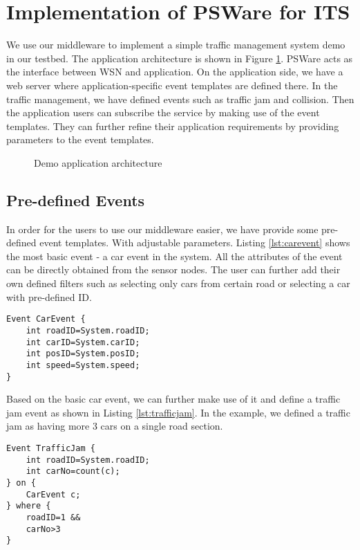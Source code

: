 \section{Implementation of PSWare for ITS}
We use our middleware to implement a simple traffic management system demo in our testbed. The application architecture is shown in Figure \ref{fig:appdemo}. PSWare acts as the interface between WSN and application. On the application side, we have a web server where application-specific event templates are defined there. In the traffic management, we have defined events such as traffic jam and collision. Then the application users can subscribe the service by making use of the event templates. They can further refine their application requirements by providing parameters to the event templates.

\begin{figure}
\centering
{}
\caption{Demo application architecture}
\label{fig:appdemo}
\end{figure}

\subsection{Pre-defined Events}
In order for the users to use our middleware easier, we have provide some pre-defined event templates. With adjustable parameters. Listing \ref{lst:carevent} shows the most basic event - a car event in the system. All the attributes of the event can be directly obtained from the sensor nodes. The user can further add their own defined filters such as selecting only cars from certain road or selecting a car with pre-defined ID.

\begin{lstlisting}[caption=Car event, label=lst:carevent]
Event CarEvent {
	int roadID=System.roadID;
	int carID=System.carID;
	int posID=System.posID;
	int speed=System.speed;
}
\end{lstlisting}

Based on the basic car event, we can further make use of it and define a traffic jam event as shown in Listing \ref{lst:trafficjam}. In the example, we defined a traffic jam as having more 3 cars on a single road section.

\begin{lstlisting}[caption=Traffic jam event, label=lst:trafficjam]
Event TrafficJam {
	int roadID=System.roadID;
	int carNo=count(c);
} on {
	CarEvent c;
} where {
	roadID=1 &&
	carNo>3
}
\end{lstlisting}


